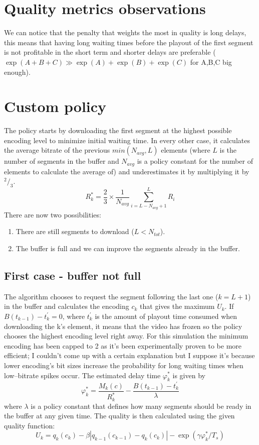 \documentclass[10pt, a4paper]{article}
\begin{document}
\begin{multicols}{2}
    \section{Quality metrics observations}
    We can notice that the penalty that weights the most in quality is long delays,
    this means that having long waiting times before the playout of the first segment
    is not profitable in the short term and shorter delays are preferable
    ($\exp(A+B+C) \gg \exp(A) + \exp(B) + \exp(C)$ for A,B,C big enough).

    \section{Custom policy}
    The policy starts by downloading the first segment at the highest possible encoding level
    to minimize initial waiting time.
    In every other case, it calculates the average bitrate of the
    previous $min(N_{avg}, L)$ elements (where $L$ is the number of segments in the buffer and
    $N_{avg}$ is a policy constant for the number of elements to calculate the average of)
    and underestimates it by multiplying it by $^2/_3$.
    \[R^{*}_{k} = \frac{2}{3} \times \frac{1}{N_{avg}}\displaystyle\sum_{i=L-N_{avg}+1}^{L}R_i\]
    There are now two possibilities:
    \begin{enumerate}
        \item There are still segments to download ($L < N_{tot}$).
        \item The buffer is full and we can improve the segments already in the buffer.
    \end{enumerate}

        \subsection{First case - buffer not full}
        The algorithm chooses to request the segment following the
        last one ($k = L+1$) in the buffer and calculates the encoding $c_k$ that gives the maximum
        $U_k$.
        If $B(t_{k-1}) - t^{'}_k = 0$, where $t^{'}_k$ is the amount of playout time consumed when
        downloading the k's element, it means that the video has frozen so
        the policy chooses the highest encoding level right away.
        \linebreak
        For this simulation the minimum encoding has been capped to 2 as it's been experimentally
        proven to be more efficient; I couldn't come up with a certain explanation but I
        suppose it's because lower encoding's bit sizes increase the probability for long
        waiting times when low--bitrate spikes occur.
        \linebreak
        The estimated delay time $\varphi^{*}_k$ is given by
        \[\varphi^{*}_k = \frac{M_k(c)}{R^{*}_{k}} - \frac{B(t_{k-1}) - t^{'}_k}{\lambda}\]
        where $\lambda$ is a policy constant that defines how many segments should be ready
        in the buffer at any given time.
        \linebreak
        The quality is then calculated using the given quality function:
        \[U_k = q_k(c_k) - \beta|q_{k-1}(c_{k-1}) - q_k(c_k)| - \exp(\gamma \varphi^{*}_k/T_s)\]


\end{multicols}
\end{document}
